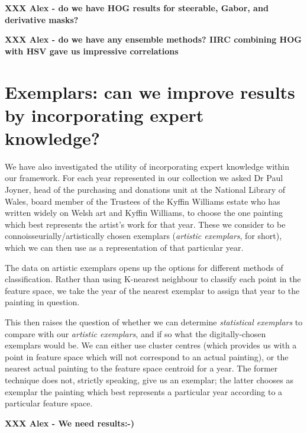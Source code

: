 \documentclass[conference,a4paper]{IEEEtran}
\begin{document}
\textbf{XXX Alex - do we have HOG results for steerable, Gabor, and derivative masks?}

\textbf{XXX Alex - do we have any ensemble methods? IIRC combining HOG with HSV gave us impressive correlations}

\section{Exemplars: can we improve results by incorporating expert knowledge? }

We have also investigated the utility of incorporating expert
knowledge within our framework. For each year represented in
our collection we asked Dr Paul Joyner, head of the purchasing and donations unit at the National 
Library of Wales, board member of the Trustees of the Kyffin Williams estate who has written 
widely on Welsh art and Kyffin Williams, to choose the one painting which best represents the 
artist's work for that year. These we consider to be connoisseurially/artistically chosen 
exemplars (\emph{artistic exemplars}, for short), which
we can then use as a representation of that particular year.

The data on artistic exemplars opens up the options for different methods of
classification. Rather than using K-nearest neighbour to classify each point in
the feature space, we take the year of the nearest exemplar to assign that year
to the painting in question. 

This then raises the question of whether we can determine \emph{statistical
exemplars} to compare with our \emph{artistic exemplars}, and if so what the
digitally-chosen exemplars would be.  We can either use cluster centres (which
provides us with a point in feature space which will not correspond to an
actual painting), or the nearest actual painting to the feature space centroid
for a year. The former technique does not, strictly speaking, give us an
exemplar; the latter chooses as exemplar the painting which best represents a
particular year according to a particular feature space. 

\textbf{XXX Alex - We need results:-)}
\end{document}
